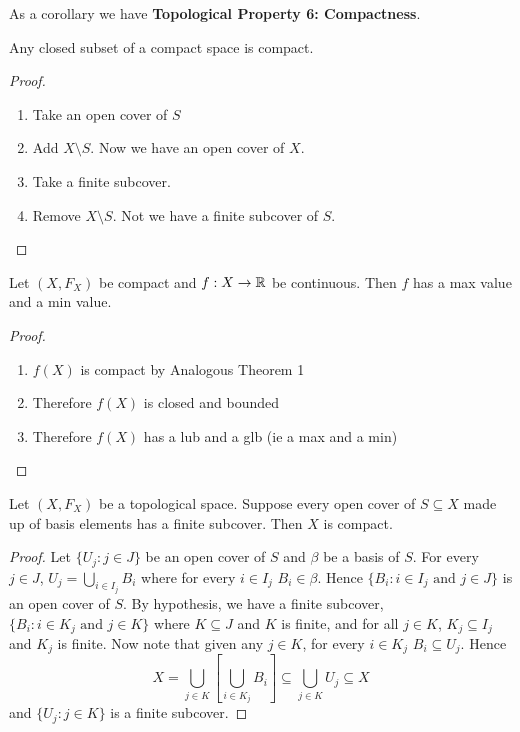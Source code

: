 As a corollary we have \textbf{Topological Property 6: Compactness}.\\
\begin{theorem}
	Any closed subset of a compact space is compact. 
\end{theorem}
\begin{proof}
	\begin{enumerate}
		\item Take an open cover of $S$ 
		\item Add $X \setminus S$. Now we have an open cover of $X$. 
		\item Take a finite subcover. 
		\item Remove $X \setminus S$. Not we have a finite subcover of $S$. 
	\end{enumerate}
\end{proof}
\begin{theorem}
	 Let $(X, F_X)$ be compact and $f : X \rightarrow \mathbb R$ be continuous. Then $f$ has a max value and a min value. 
\end{theorem}
\begin{proof}
	\begin{enumerate}
		\item $f(X)$ is compact by Analogous Theorem 1 
		\item Therefore $f(X)$ is closed and bounded 
		\item Therefore $f(X)$ has a lub and a glb (ie a max and a min) 
	\end{enumerate}
\end{proof}
\begin{smallfact}
	Let $(X, F_X)$ be a topological space. Suppose every open cover of $S \subseteq X$ made up of basis elements has a finite subcover. Then $X$ is compact. 
\end{smallfact}
\begin{proof}
	Let $\{U_j : j \in J\}$ be an open cover of $S$ and $\beta$ be a basis of $S$. For every $j \in J$, $U_j = \bigcup_{i \in I_j}B_i$ where for every $i \in I_j$ $B_i \in \beta$. Hence $\{B_i : i \in I_j \text{ and } j \in J\}$ is an open cover of $S$. By hypothesis, we have a finite subcover, $\{B_i : i \in K_j \text{ and } j \in K\}$ where $K \subseteq J$ and $K$ is finite, and for all $j \in K$, $K_j \subseteq I_j$ and $K_j$ is finite. Now note that given any $j \in K$, for every $i \in K_j$ $B_i \subseteq U_j$. Hence
	\[X = \bigcup_{j\in K} \left[ \bigcup_{i \in K_j} B_i \right] \subseteq \bigcup_{j\in K} U_j \subseteq X\]
	and $\{U_j : j\in K\}$ is a finite subcover. 
\end{proof}
